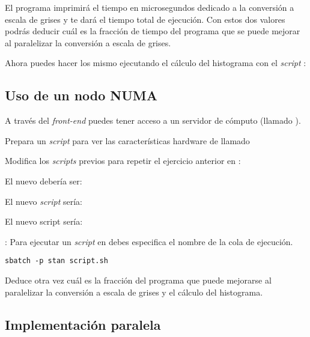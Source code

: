 El programa imprimirá el tiempo en microsegundos dedicado a la conversión a
escala de grises y  te dará el tiempo total de ejecución.
Con estos dos valores podrás deducir cuál es la fracción de tiempo del programa
que se puede mejorar al paralelizar la conversión a escala de grises.

Ahora puedes hacer los mismo ejecutando el cálculo del histograma con el
\emph{script} :



\subsection{Uso de un nodo NUMA}

A través del \emph{front-end}  puedes tener acceso a un
servidor de cómputo (llamado ).

Prepara un \emph{script} para ver las características hardware de
 llamado 



Modifica los \emph{scripts} previos para repetir el ejercicio anterior en
:

El nuevo  debería ser:



El nuevo \emph{script}  sería:



El nuevo script  sería:



: 
Para ejecutar un \emph{script} en  debes especifica el nombre de
la cola de ejecución.

\begin{lstlisting}[style=terminal]
sbatch -p stan script.sh
\end{lstlisting}

Deduce otra vez cuál es la fracción del programa que puede mejorarse al
paralelizar la conversión a escala de grises y el cálculo del histograma.

\subsection{Implementación paralela}

